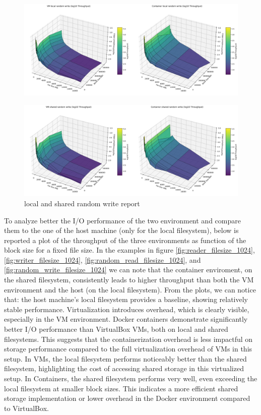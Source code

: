 \begin{figure}[H]
    \centering
    \includegraphics[width=\linewidth]{assets/VM local random write_Container local random write_log_surfaces.png}
        \end{figure}
\begin{figure}[H]
    \centering
    \includegraphics[width=\linewidth]{assets/VM shared random write_Container shared random write_log_surfaces.png}
    \caption{local and shared random write report}
    \label{fig:random write local and shared}
\end{figure}

To analyze better the I/O performance of the two environment and compare them to the one of the host machine (only for the local filesystem), below is reported a plot of the throughput of the three environments as function of the block size for a fixed file size. In the examples in figure \ref{fig:reader_filesize_1024}, \ref{fig:writer_filesize_1024}, \ref{fig:random_read_filesize_1024}, and \ref{fig:random_write_filesize_1024} we can note that the container enviroment, on the shared filesystem, consistently leads to higher throughput than both the VM environment and the host (on the local filesystem). 
From the plots, we can notice that: the host machine's local filesystem provides a baseline, showing relatively stable performance. Virtualization introduces overhead, which is clearly visible, especially in the VM environment. Docker containers demonstrate significantly better I/O performance than VirtualBox VMs, both on local and shared filesystems. This suggests that the containerization overhead is less impactful on storage performance compared to the full virtualization overhead of VMs in this setup. 
In VMs, the local filesystem performs noticeably better than the shared filesystem, highlighting the cost of accessing shared storage in this virtualized setup. In Containers, the shared filesystem performs very well, even exceeding the local filesystem at smaller block sizes. This indicates a more efficient shared storage implementation or lower overhead in the Docker environment compared to VirtualBox.

